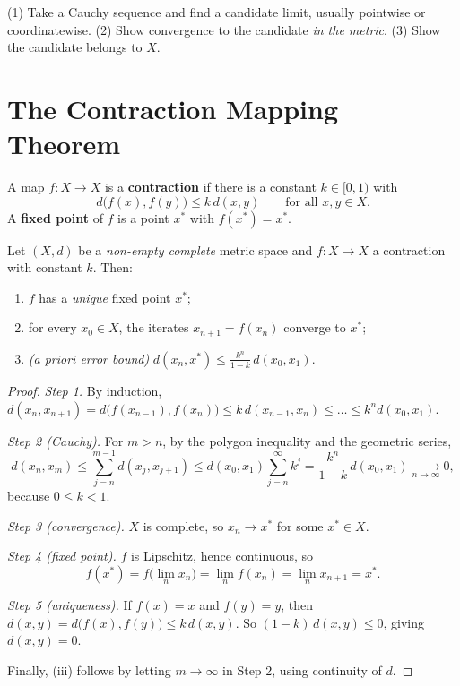 \begin{examtip}
(1) Take a Cauchy sequence and find a candidate limit, usually pointwise or coordinatewise. (2) Show convergence to the candidate \emph{in the metric}. (3) Show the candidate belongs to $X$.
\end{examtip}

\section{The Contraction Mapping Theorem}
\begin{definition}\label{def:contraction}
A map $f\colon X\to X$ is a \textbf{contraction} if there is a constant $k\in[0,1)$ with
\[ d\bigl(f(x),f(y)\bigr)\le k\,d(x,y)\qquad\text{for all }x,y\in X. \]
A \textbf{fixed point} of $f$ is a point $x^*$ with $f(x^*)=x^*$.
\end{definition}

\begin{theorem}\label{thm:cmt}
Let $(X,d)$ be a \emph{non-empty complete} metric space and $f\colon X\to X$ a contraction with constant $k$. Then:
\begin{enumerate}[label=(\roman*)]
  \item $f$ has a \emph{unique} fixed point $x^*$;
  \item for every $x_0\in X$, the iterates $x_{n+1}=f(x_n)$ converge to $x^*$;
  \item \emph{(a priori error bound)} $\displaystyle d(x_n,x^*)\le\frac{k^n}{1-k}\,d(x_0,x_1)$.
\end{enumerate}
\end{theorem}
\begin{proof}
\emph{Step 1.} By induction, $d(x_n,x_{n+1})=d\bigl(f(x_{n-1}),f(x_n)\bigr)\le k\,d(x_{n-1},x_n)\le\dots\le k^n d(x_0,x_1)$.

\emph{Step 2 (Cauchy).} For $m>n$, by the polygon inequality and the geometric series,
\[
  d(x_n,x_m)\le\sum_{j=n}^{m-1}d(x_j,x_{j+1})\le d(x_0,x_1)\sum_{j=n}^{\infty}k^j=\frac{k^n}{1-k}\,d(x_0,x_1)\xrightarrow[n\to\infty]{}0,
\]
because $0\le k<1$.

\emph{Step 3 (convergence).} $X$ is complete, so $x_n\to x^*$ for some $x^*\in X$.

\emph{Step 4 (fixed point).} $f$ is Lipschitz, hence continuous, so
\[ f(x^*)=f\bigl(\lim_n x_n\bigr)=\lim_n f(x_n)=\lim_n x_{n+1}=x^* . \]

\emph{Step 5 (uniqueness).} If $f(x)=x$ and $f(y)=y$, then $d(x,y)=d\bigl(f(x),f(y)\bigr)\le k\,d(x,y)$. So $(1-k)\,d(x,y)\le0$, giving $d(x,y)=0$.

Finally, (iii) follows by letting $m\to\infty$ in Step 2, using continuity of $d$.
\end{proof}

